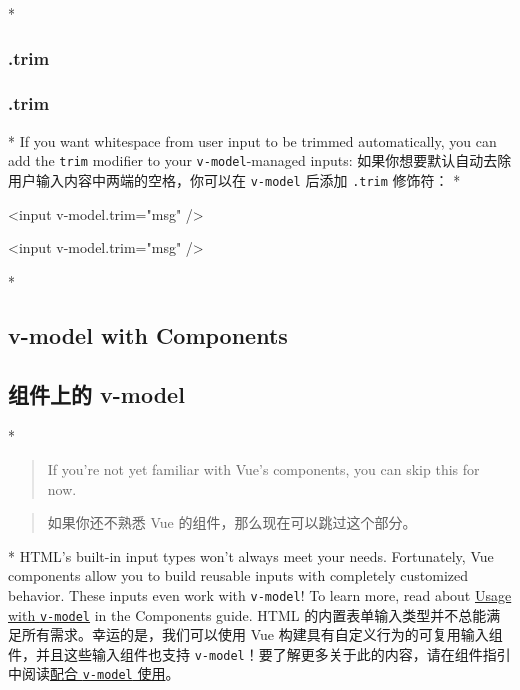 \begin{paracol}{2}
\switchcolumn[0]*%
\subsubsection{.trim}
\switchcolumn
\subsubsection{.trim}
\switchcolumn[0]*%
If you want whitespace from user input to be trimmed automatically, you
can add the \texttt{trim} modifier to your \texttt{v-model}-managed
inputs:
\switchcolumn
如果你想要默认自动去除用户输入内容中两端的空格，你可以在
\texttt{v-model} 后添加 \texttt{.trim} 修饰符：
\switchcolumn[0]*%
\begin{codeHtml}
<input v-model.trim="msg" />
\end{codeHtml}
\switchcolumn
\begin{codeHtml}
<input v-model.trim="msg" />
\end{codeHtml}
\switchcolumn[0]*%
\subsection{v-model with Components}
\switchcolumn
\subsection{组件上的 v-model}
\switchcolumn[0]*%
\begin{quote}
If you're not yet familiar with Vue's components, you can skip this for
now.
\end{quote}
\switchcolumn
\begin{quote}
如果你还不熟悉 Vue 的组件，那么现在可以跳过这个部分。
\end{quote}
\switchcolumn[0]*%
HTML's built-in input types won't always meet your needs. Fortunately,
Vue components allow you to build reusable inputs with completely
customized behavior. These inputs even work with \texttt{v-model}! To
learn more, read about
\href{https://vuejs.org/guide/components/v-model.html}{Usage with
\texttt{v-model}} in the Components guide.
\switchcolumn
HTML 的内置表单输入类型并不总能满足所有需求。幸运的是，我们可以使用 Vue
构建具有自定义行为的可复用输入组件，并且这些输入组件也支持
\texttt{v-model}！要了解更多关于此的内容，请在组件指引中阅读\href{https://cn.vuejs.org/guide/components/v-model.html}{配合
\texttt{v-model} 使用}。
\end{paracol}






